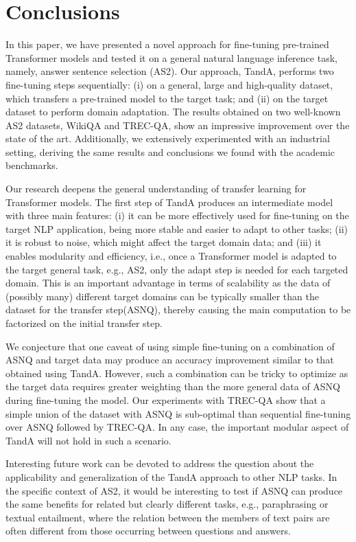 \documentclass[letterpaper]{article} \usepackage{aaai20}  \usepackage{times}  \usepackage{helvet} \usepackage{courier}  \usepackage[hyphens]{url}  \usepackage{graphicx} \urlstyle{rm} \def\UrlFont{\rm}  \usepackage{graphicx}  \usepackage{todonotes}
\newcommand{\TANDA}{T{\sc and}A}
\begin{document}
\section{Conclusions}
\label{con}
In this paper, we have presented a novel approach for fine-tuning pre-trained Transformer models and tested it on a general natural language inference task, namely, answer sentence selection (AS2). 
Our approach, {\TANDA}, performs two fine-tuning steps sequentially: (i) on a general, large and high-quality dataset, which transfers a pre-trained model to the target task; and (ii) on the target dataset to perform domain adaptation. 
The results obtained on two well-known AS2 datasets, WikiQA and TREC-QA, show an impressive improvement over the state of the art. Additionally, we extensively experimented with an industrial setting, deriving the same results and conclusions we found with the academic benchmarks.

Our research deepens the general understanding of transfer learning for Transformer models. The first step of  {\TANDA} produces an intermediate model with three main features: (i) it can be more effectively used for fine-tuning on the target NLP application, being more stable and easier to adapt to other tasks; (ii) it is robust to noise, which might affect the target domain data; and (iii) it enables modularity and efficiency, i.e., once a Transformer model is adapted to the target general task, e.g., AS2, only the adapt step is needed for each targeted domain. This is an important advantage in terms of scalability as the data of (possibly many) different target domains can be typically smaller than the dataset for the transfer step(ASNQ), thereby causing the main computation to be factorized on the initial transfer step.

We conjecture that one caveat of using simple fine-tuning on a combination of ASNQ and target data may produce an accuracy improvement similar to that obtained using {\TANDA}. However, such a combination can be tricky to optimize as the target data requires greater weighting than the more general data of ASNQ during fine-tuning the model. Our experiments with TREC-QA show that a simple union of the dataset with ASNQ is sub-optimal than sequential fine-tuning over ASNQ followed by TREC-QA. In any case, the important modular aspect of {\TANDA} will not hold in such a scenario.

Interesting future work can be devoted to address the question about the applicability and generalization of the {\TANDA} approach to other NLP tasks. In the specific context of AS2, it would be interesting to test if ASNQ can produce the same benefits for related but clearly different tasks, e.g., paraphrasing or textual entailment, where the relation between the members of text pairs are often different from those occurring between questions and answers.



\end{document}
